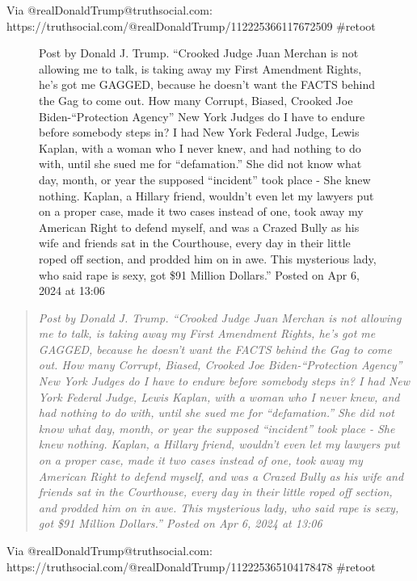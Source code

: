 Via @realDonaldTrump@truthsocial.com:
https://truthsocial.com/@realDonaldTrump/112225366117672509 \#retoot

\begin{figure}
\centering
{}
\caption{Post by Donald J. Trump. ``Crooked Judge Juan Merchan is not
allowing me to talk, is taking away my First Amendment Rights, he's got
me GAGGED, because he doesn't want the FACTS behind the Gag to come out.
How many Corrupt, Biased, Crooked Joe Biden-``Protection Agency'' New
York Judges do I have to endure before somebody steps in? I had New York
Federal Judge, Lewis Kaplan, with a woman who I never knew, and had
nothing to do with, until she sued me for ``defamation.'' She did not
know what day, month, or year the supposed ``incident'' took place - She
knew nothing. Kaplan, a Hillary friend, wouldn't even let my lawyers put
on a proper case, made it two cases instead of one, took away my
American Right to defend myself, and was a Crazed Bully as his wife and
friends sat in the Courthouse, every day in their little roped off
section, and prodded him on in awe. This mysterious lady, who said rape
is sexy, got \$91 Million Dollars.'' Posted on Apr 6, 2024 at 13:06}
\end{figure}

\begin{quote}
\emph{Post by Donald J. Trump. ``Crooked Judge Juan Merchan is not
allowing me to talk, is taking away my First Amendment Rights, he's got
me GAGGED, because he doesn't want the FACTS behind the Gag to come out.
How many Corrupt, Biased, Crooked Joe Biden-``Protection Agency'' New
York Judges do I have to endure before somebody steps in? I had New York
Federal Judge, Lewis Kaplan, with a woman who I never knew, and had
nothing to do with, until she sued me for ``defamation.'' She did not
know what day, month, or year the supposed ``incident'' took place - She
knew nothing. Kaplan, a Hillary friend, wouldn't even let my lawyers put
on a proper case, made it two cases instead of one, took away my
American Right to defend myself, and was a Crazed Bully as his wife and
friends sat in the Courthouse, every day in their little roped off
section, and prodded him on in awe. This mysterious lady, who said rape
is sexy, got \$91 Million Dollars.'' Posted on Apr 6, 2024 at 13:06}
\end{quote}

Via @realDonaldTrump@truthsocial.com:
https://truthsocial.com/@realDonaldTrump/112225365104178478 \#retoot

